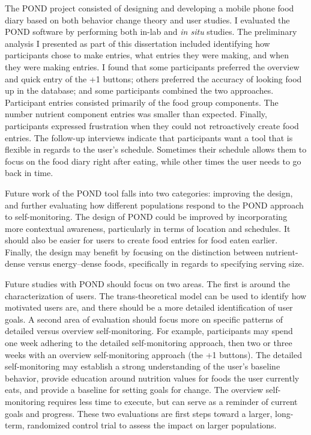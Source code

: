 The POND project consisted of designing and developing a mobile phone food diary based on both behavior change theory and user studies. I evaluated the POND software by performing both in-lab and \textit{in situ} studies. The preliminary analysis I presented as part of this dissertation included identifying how participants chose to make entries, what entries they were making, and when they were making entries. I found that some participants preferred the overview and quick entry of the +1 buttons; others preferred the accuracy of looking food up in the database; and some participants combined the two approaches. Participant entries consisted primarily of the food group components. The number nutrient component entries was smaller than expected. Finally, participants expressed frustration when they could not retroactively create food entries. The follow-up interviews indicate that participants want a tool that is flexible in regards to the user's schedule. Sometimes their schedule allows them to focus on the food diary right after eating, while other times the user needs to go back in time. 

Future work of the POND tool falls into two categories: improving the design, and further evaluating how different populations respond to the POND approach to self-monitoring. The design of POND could be improved by incorporating more contextual awareness, particularly in terms of location and schedules. It should also be easier for users to create food entries for food eaten earlier. Finally, the design may benefit by focusing on the distinction between nutrient-dense versus energy--dense foods, specifically in regards to specifying serving size. 

Future studies with POND should focus on two areas. The first is around the characterization of users. The trans-theoretical model \citep{prochaska_transtheoretical_1997} can be used to identify how motivated users are, and there should be a more detailed identification of user goals. A second area of evaluation should focus more on specific patterns of detailed versus overview self-monitoring. For example, participants may spend one week adhering to the detailed self-monitoring approach, then two or three weeks with an overview self-monitoring approach (the +1 buttons).  The detailed self-monitoring may establish a strong understanding of the user's baseline behavior, provide education around nutrition values for foods the user currently eats, and provide a baseline for setting goals for change. The overview self-monitoring requires less time to execute, but can serve as a reminder of current goals and progress. These two evaluations are first steps toward a larger, long-term, randomized control trial to assess the impact on larger populations. 

